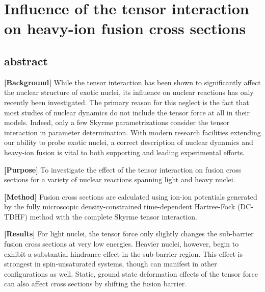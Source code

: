 
\chapter{Influence of the tensor interaction on heavy-ion fusion cross sections}\label{chapters:chapter_5}
\vspace{-7mm}

\author{K. Godbey}
\author{Lu Guo (郭璐)}
\author{A. S. Umar}

\date{\today}

\section*{abstract}

		{\bf [Background]}		
		While the tensor interaction has been shown to significantly affect the nuclear structure of exotic nuclei, its influence on nuclear reactions has only recently been investigated.
		The primary reason for this neglect is the fact that most studies of nuclear dynamics do not include the tensor force at all in their models.
		Indeed, only a few Skyrme parametrizations consider the tensor interaction in parameter determination.
		With modern research facilities extending our ability to probe exotic nuclei, a correct description of nuclear dynamics and heavy-ion fusion is vital to both supporting and leading experimental efforts.
		
		{\bf [Purpose]}
		To investigate the effect of the tensor interaction on fusion cross sections for a variety of nuclear reactions spanning light and heavy nuclei.
		
		{\bf [Method]}
		Fusion cross sections are calculated using ion-ion potentials generated by the fully microscopic density-constrained time-dependent Hartree-Fock (DC-TDHF) method with the complete Skyrme tensor interaction.
		
		{\bf [Results]}
		For light nuclei, the tensor force only slightly changes the sub-barrier fusion cross sections at very low energies.
		Heavier nuclei, however, begin to exhibit a substantial hindrance effect in the sub-barrier region.
		This effect is strongest in spin-unsaturated systems, though can manifest in other configurations as well.
		Static, ground state deformation effects of the tensor force can also affect cross sections by shifting the fusion barrier.
		
